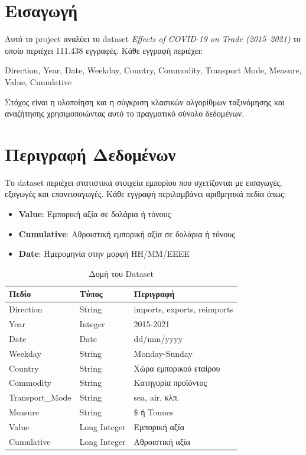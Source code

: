 \documentclass[a4paper,12pt]{article}
\begin{document}
	\newpage
	\section{Εισαγωγή}
	
	Αυτό το project αναλύει το dataset \textit{Effects of COVID-19 on Trade (2015–2021)} το οποίο περιέχει 111.438 εγγραφές. Κάθε εγγραφή περιέχει:
	
	\begin{center}
		Direction, Year, Date, Weekday, Country, Commodity, Transport Mode, Measure, Value, Cumulative
	\end{center}
	
	Στόχος είναι η υλοποίηση και η σύγκριση κλασικών αλγορίθμων ταξινόμησης και αναζήτησης χρησιμοποιώντας αυτό το πραγματικό σύνολο δεδομένων.
	
	\section{Περιγραφή Δεδομένων}
	
	Το dataset περιέχει στατιστικά στοιχεία εμπορίου που σχετίζονται με εισαγωγές, εξαγωγές και επανεισαγωγές. Κάθε εγγραφή περιλαμβάνει αριθμητικά πεδία όπως:
	
	\begin{itemize}
		\item \textbf{Value}: Εμπορική αξία σε δολάρια ή τόνους
		\item \textbf{Cumulative}: Αθροιστική εμπορική αξία σε δολάρια ή τόνους
		\item \textbf{Date}: Ημερομηνία στην μορφή ΗΗ/ΜΜ/ΕΕΕΕ
	\end{itemize}
	
	\begin{table}[H]
		\centering
		\begin{tabular}{|l|l|l|}
			\hline
			\textbf{Πεδίο} & \textbf{Τύπος} & \textbf{Περιγραφή} \\
			\hline
			Direction & String & imports, exports, reimports \\
			Year & Integer & 2015-2021 \\
			Date & Date & dd/mm/yyyy \\
			Weekday & String & Monday-Sunday \\
			Country & String & Χώρα εμπορικού εταίρου \\
			Commodity & String & Κατηγορία προϊόντος \\
			Transport\_Mode & String & sea, air, κλπ. \\
			Measure & String & \$ ή Tonnes \\
			Value & Long Integer & Εμπορική αξία \\
			Cumulative & Long Integer & Αθροιστική αξία \\
			\hline
		\end{tabular}
		\caption{Δομή του Dataset}
	\end{table}
	
\end{document}

